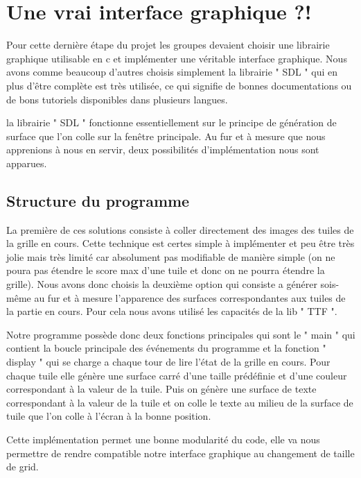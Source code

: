 \documentclass[12pt]{article}
\begin{document}
\newpage
\section{Une vrai interface graphique ?!}
Pour cette dernière étape du projet les groupes devaient choisir une librairie graphique
utilisable en c et implémenter une véritable interface graphique. Nous avons comme
beaucoup d'autres choisis simplement la librairie " SDL " \cite{SDL} qui en
plus d’être complète est très utilisée, ce qui signifie de bonnes documentations ou
de bons tutoriels disponibles dans plusieurs langues.\par la librairie " SDL "
fonctionne essentiellement sur le principe de génération de surface que l'on colle sur la fenêtre principale. Au fur et à mesure que nous apprenions à nous en servir,
deux possibilités d’implémentation nous sont apparues.

\subsection{Structure du programme}
La première de ces solutions consiste à coller directement des images des tuiles de la grille en cours.
Cette technique est certes simple à implémenter et peu être très jolie mais très limité
car absolument pas modifiable de manière simple (on ne poura pas étendre le score max d'une tuile
et donc on ne pourra étendre la grille).
Nous avons donc choisis la deuxième option qui consiste a générer sois-même au fur et à mesure
l'apparence des surfaces correspondantes aux tuiles de la partie en cours. Pour cela nous avons utilisé
les capacités de la lib " TTF ".
\par Notre programme possède donc deux fonctions principales qui sont le " main " qui contient la boucle
principale des événements du programme et la fonction " display " qui se charge a chaque tour de lire l'état
de la grille en cours. Pour chaque tuile elle génère une surface carré d'une taille prédéfinie et d'une couleur
correspondant à la valeur de la tuile. Puis on génère une surface de texte correspondant à la valeur de la tuile
et on colle le texte au milieu de la surface de tuile que l'on colle à l’écran à la bonne position.
\par Cette implémentation permet une bonne modularité du code, elle va nous permettre de rendre compatible
 notre interface graphique au changement de taille de grid.
\end{document}
